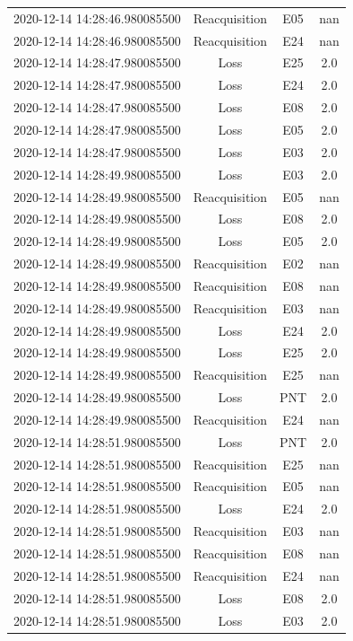 \begin{enumerate}
\begin{longtabu}{cccc}
2020{-}12{-}14 14:28:46.980085500&Reacquisition&E05&nan\\%
2020{-}12{-}14 14:28:46.980085500&Reacquisition&E24&nan\\%
2020{-}12{-}14 14:28:47.980085500&Loss&E25&2.0\\%
2020{-}12{-}14 14:28:47.980085500&Loss&E24&2.0\\%
2020{-}12{-}14 14:28:47.980085500&Loss&E08&2.0\\%
2020{-}12{-}14 14:28:47.980085500&Loss&E05&2.0\\%
2020{-}12{-}14 14:28:47.980085500&Loss&E03&2.0\\%
2020{-}12{-}14 14:28:49.980085500&Loss&E03&2.0\\%
2020{-}12{-}14 14:28:49.980085500&Reacquisition&E05&nan\\%
2020{-}12{-}14 14:28:49.980085500&Loss&E08&2.0\\%
2020{-}12{-}14 14:28:49.980085500&Loss&E05&2.0\\%
2020{-}12{-}14 14:28:49.980085500&Reacquisition&E02&nan\\%
2020{-}12{-}14 14:28:49.980085500&Reacquisition&E08&nan\\%
2020{-}12{-}14 14:28:49.980085500&Reacquisition&E03&nan\\%
2020{-}12{-}14 14:28:49.980085500&Loss&E24&2.0\\%
2020{-}12{-}14 14:28:49.980085500&Loss&E25&2.0\\%
2020{-}12{-}14 14:28:49.980085500&Reacquisition&E25&nan\\%
2020{-}12{-}14 14:28:49.980085500&Loss&PNT&2.0\\%
2020{-}12{-}14 14:28:49.980085500&Reacquisition&E24&nan\\%
2020{-}12{-}14 14:28:51.980085500&Loss&PNT&2.0\\%
2020{-}12{-}14 14:28:51.980085500&Reacquisition&E25&nan\\%
2020{-}12{-}14 14:28:51.980085500&Reacquisition&E05&nan\\%
2020{-}12{-}14 14:28:51.980085500&Loss&E24&2.0\\%
2020{-}12{-}14 14:28:51.980085500&Reacquisition&E03&nan\\%
2020{-}12{-}14 14:28:51.980085500&Reacquisition&E08&nan\\%
2020{-}12{-}14 14:28:51.980085500&Reacquisition&E24&nan\\%
2020{-}12{-}14 14:28:51.980085500&Loss&E08&2.0\\%
2020{-}12{-}14 14:28:51.980085500&Loss&E03&2.0\\%

\end{longtabu}
\end{enumerate}
